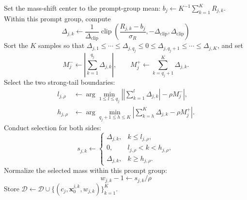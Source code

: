 \begin{algorithm}[H]
\begin{algorithmic}[1]
                \State Set the mass-shift center to the prompt-group mean:
                $b_j\leftarrow K^{-1}\sum_{k=1}^{K}R_{j,k}$.
                \State Within this prompt group, compute
                \[
                    \Delta_{j,k}\leftarrow
                    \frac{1}{\Delta_{\mathrm{clip}}}
                    \operatorname{clip}\!\left(
                        \frac{R_{j,k}-b_j}{\sigma_R},
                        -\Delta_{\mathrm{clip}},
                        \Delta_{\mathrm{clip}}
                    \right)
                \]
                \State Sort the $K$ samples so that
                $\Delta_{j,1}\le\cdots\le\Delta_{j,q_j}\le0
                \le\Delta_{j,q_j+1}\le\cdots\le\Delta_{j,K}$, and set
                \[
                    M_j^-\leftarrow\left|\sum_{k=1}^{q_j}\Delta_{j,k}\right|,
                    \qquad
                    M_j^+\leftarrow\sum_{k=q_j+1}^{K}\Delta_{j,k}.
                \]
                \State Select the two strong-tail boundaries:
                \[
                    \begin{aligned}
                        l_{j,\rho}&\leftarrow
                        \arg\min_{1\le l\le q_j}
                        \left|\left|\sum_{k=1}^{l}\Delta_{j,k}\right|
                        -\rho M_j^-\right|,\\
                        h_{j,\rho}&\leftarrow
                        \arg\min_{q_j+1\le h\le K}
                        \left|\sum_{k=h}^{K}\Delta_{j,k}
                        -\rho M_j^+\right|.
                    \end{aligned}
                \]
                \State Conduct selection for both sides:
                \[
                    s_{j,k}\leftarrow
                    \begin{cases}
                        \Delta_{j,k},&k\le l_{j,\rho},\\
                        0,&l_{j,\rho}<k<h_{j,\rho},\\
                        \Delta_{j,k},&k\ge h_{j,\rho}.
                    \end{cases}
                \]
                \State Normalize the selected mass within this prompt group:
                \[
                    w_{j,k}-1\leftarrow s_{j,k}/\rho
                \]
                \State Store
                $\mathcal{D}\leftarrow\mathcal{D}\cup
                \{(c_j,\mathbf{x}_0^{j,k},w_{j,k})\}_{k=1}^{K}$.
            \EndFor


\end{algorithmic}
\end{algorithm}
